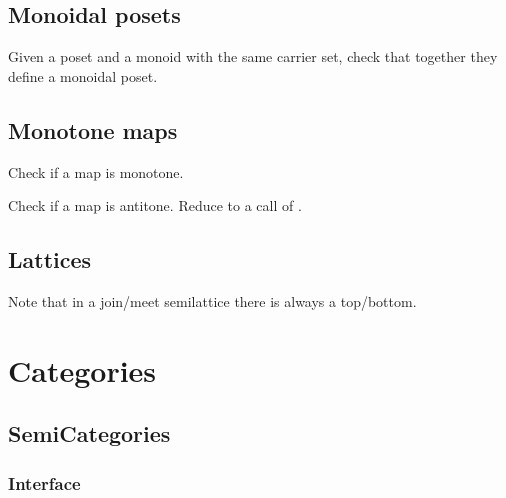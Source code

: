 \section{Monoidal posets}



\begin{exercise}
  Given a poset and a monoid with the same carrier set, check that together they define a monoidal poset.

\end{exercise}


\section{Monotone maps}




\begin{exercise}
  Check if a map is monotone.

\end{exercise}


\begin{exercise}
  Check if a map is antitone. Reduce to a call of .

\end{exercise}


\section{Lattices}





Note that in a join/meet semilattice there is always a top/bottom.


\chapter{Categories}


\section{SemiCategories}
\subsection*{Interface}

